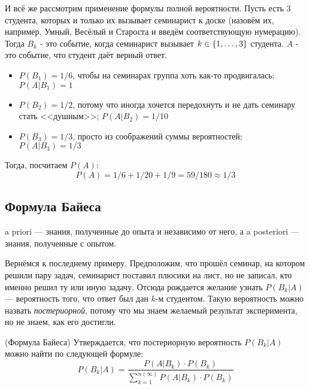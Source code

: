 \begin{example}
	И всё же рассмотрим применение формулы полной вероятности. Пусть есть 3 студента, которых и только их вызывает семинарист к доске (назовём их, например, Умный, Весёлый и Староста и введём соответствующую нумерацию). Тогда $B_k$ - это событие, когда семинарист вызывает $k \in \{1, \ldots, 3\}$ студента. $A$ - это событие, что студент даёт верный ответ.
	\begin{itemize}
		\item $P(B_1) = 1/6$, чтобы на семинарах группа хоть как-то продвигалась; $P(A | B_1) = 1$
		
		\item $P(B_2) = 1/2$, потому что иногда хочется передохнуть и не дать семинару стать <<душным>>; $P(A | B_2) = 1 / 10$
		
		\item $P(B_3) = 1/3$, просто из соображений суммы вероятностей; $P(A | B_3) = 1 / 3$
	\end{itemize}
	Тогда, посчитаем $P(A)$:
	\[
		P(A) = 1 / 6 + 1 / 20 + 1 / 9 = 59 / 180 \approx 1 / 3
	\]
\end{example}

\subsection{Формула Байеса}

\begin{note}
	a priori --- знания, полученные до опыта и независимо от него, а a posteriori --- знания, полученные с опытом.
\end{note}

\begin{example}
	Вернёмся к последнему примеру. Предположим, что прошёл семинар, на котором решили пару задач, семинарист поставил плюсики на лист, но не записал, кто именно решил ту или иную задачу. Отсюда рождается желание узнать $P(B_k | A)$ --- вероятность того, что ответ был дан $k$-м студентом. Такую вероятность можно назвать \textit{постериорной}, потому что мы знаем желаемый результат эксперимента, но не знаем, как его достигли.
\end{example}

\begin{theorem} (Формула Байеса)
	Утверждается, что постериорную вероятность $P(B_k | A)$ можно найти по следующей формуле:
	\[
		P(B_k | A) = \frac{P(A | B_k) \cdot P(B_k)}{\sum_{k = 1}^{n(\infty)} P(A | B_k) \cdot P(B_k)}
	\]
\end{theorem}

